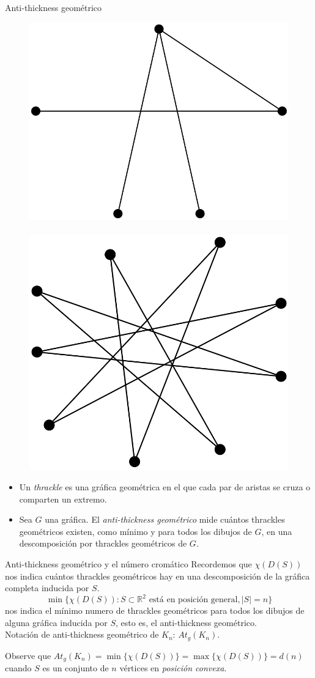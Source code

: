 \begin{frame}{Anti-thickness geométrico}
\begin{figure}
	\centering
	\includegraphics[width=0.35\linewidth]{images/thrackle_5}
	~\vrule~
	\includegraphics[width=0.3\linewidth]{images/thrackle_9}
\end{figure}
\begin{itemize}
	\item Un \emph{thrackle} es una gráfica geométrica en el que cada par de aristas se cruza o comparten un extremo.
	\item[] Sea $G$ una gráfica. El \emph{anti-thickness geométrico} mide cuántos thrackles geométricos existen, como mínimo y para todos los dibujos de $G$, en una descomposición por thrackles geométricos de $G$.
\end{itemize}

\end{frame}
\begin{frame}{Anti-thickness geométrico y el número cromático}
Recordemos que $\chi(D(S))$ nos indica cuántos thrackles geométricos hay en una descomposición de la gráfica completa inducida por $S$. 
\[
\min\{ \chi(D(S)) : S \subset \mathbb{R}^2\text{ está en posición general}, |S| = n \}
\] nos indica el mínimo numero de thrackles geométricos para todos los dibujos de alguna gráfica inducida por $S$, esto es, el anti-thickness geométrico.
\pause
\\[10pt]
Notación de anti-thickness geométrico de $K_n$: $At_g(K_n)$.

Observe que $At_g(K_n) = \min\{\chi(D(S)) \} = \max\{\chi(D(S)) \} = d(n)$ cuando $S$ es un conjunto de $n$ vértices en \emph{posición convexa}.
\end{frame}




